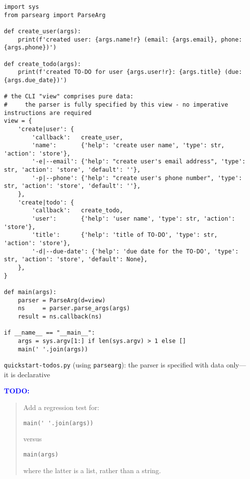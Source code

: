 \documentclass[10pt]{amsart}
\numberwithin{equation}{section}
\begin{document}
\newpage
\begin{listing}[htbp]
\begin{verbatim}
import sys
from parsearg import ParseArg

def create_user(args):
    print(f'created user: {args.name!r} (email: {args.email}, phone: {args.phone})')

def create_todo(args):
    print(f'created TO-DO for user {args.user!r}: {args.title} (due: {args.due_date})')

# the CLI "view" comprises pure data: 
#     the parser is fully specified by this view - no imperative instructions are required
view = {
    'create|user': {
        'callback':   create_user,
        'name':       {'help': 'create user name', 'type': str, 'action': 'store'},
        '-e|--email': {'help': "create user's email address", 'type': str, 'action': 'store', 'default': ''},
        '-p|--phone': {'help': "create user's phone number", 'type': str, 'action': 'store', 'default': ''},
    },
    'create|todo': {
        'callback':   create_todo,
        'user':       {'help': 'user name', 'type': str, 'action': 'store'},
        'title':      {'help': 'title of TO-DO', 'type': str, 'action': 'store'},
        '-d|--due-date': {'help': 'due date for the TO-DO', 'type': str, 'action': 'store', 'default': None},
    },
}

def main(args):
    parser = ParseArg(d=view)
    ns     = parser.parse_args(args)
    result = ns.callback(ns)

if __name__ == "__main__":
    args = sys.argv[1:] if len(sys.argv) > 1 else []
    main(' '.join(args))
\end{verbatim}
\caption{\label{org1502795}\texttt{quickstart-todos.py} (using \texttt{parsearg}): the parser is specified with data only---it is declarative}
\end{listing}

\textcolor{blue}{\bf TODO:}
\begin{quote}
Add a regression test for:

\begin{verbatim}
main(' '.join(args))
\end{verbatim}


versus

\begin{verbatim}
main(args)
\end{verbatim}


where the latter is a list, rather than a string.
\end{quote}
\end{document}
